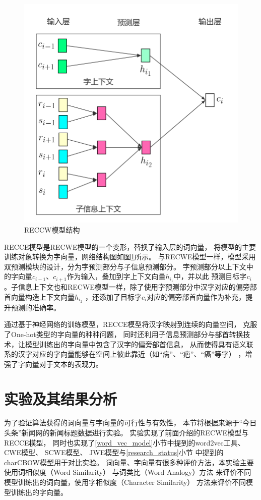 \documentclass{standalone}
\begin{document}
\begin{figure}
    \includegraphics[scale=0.4]{picture/RECCE.png}
    \caption{RECCW模型结构}
    \label{RECCE}
\end{figure}
RECCE模型是RECWE模型的一个变形，替换了输入层的词向量，
将模型的主要训练对象转换为字向量，网络结构图如图\ref{RECCE}所示。
与RECWE模型一样，模型采用双预测模块的设计，分为字预测部分与子信息预测部分。
字预测部分以上下文中的字向量$c_{i-1}$、$c_{i+1}$作为输入，叠加到字上下文向量$h_{i_1}$中，并以此
预测目标字$c_i$。子信息上下文也和RECWE模型一样，除了使用字预测部分中汉字对应的偏旁部首向量构造上下文向量$h_{i_2}$
，还添加了目标字$c_i$对应的偏旁部首向量作为补充，提升预测的准确率。

通过基于神经网络的训练模型，RECCE模型将汉字映射到连续的向量空间，
克服了One-hot类型的字向量的种种问题，
同时还利用子信息预测部分与部首转换技术，让模型训练出的字向量中包含了汉字的偏旁部首信息，
从而使得具有语义联系的汉字对应的字向量能够在空间上彼此靠近（如“病”、“疤”、“癌”等字）
，增强了字向量对于文本的表现力。



\section{实验及其结果分析}
为了验证算法获得的词向量与字向量的可行性与有效性，
本节将根据来源于“今日头条”新闻网的新闻标题数据进行实验。
实验实现了前面介绍的RECWE模型与RECCE模型，
同时也实现了\ref{word_vec_model}小节中提到的word2vec工具、
CWE模型、
SCWE模型、
JWE模型与\ref{research_status}小节
中提到的charCBOW模型用于对比实验。
词向量、字向量有很多种评价方法，本实验主要使用词相似度（Word Similarity）
与词类比（Word Analogy）方法
来评价不同模型训练出的词向量，使用字相似度（Character Similarity）
方法来评价不同模型训练出的字向量。
\end{document}
